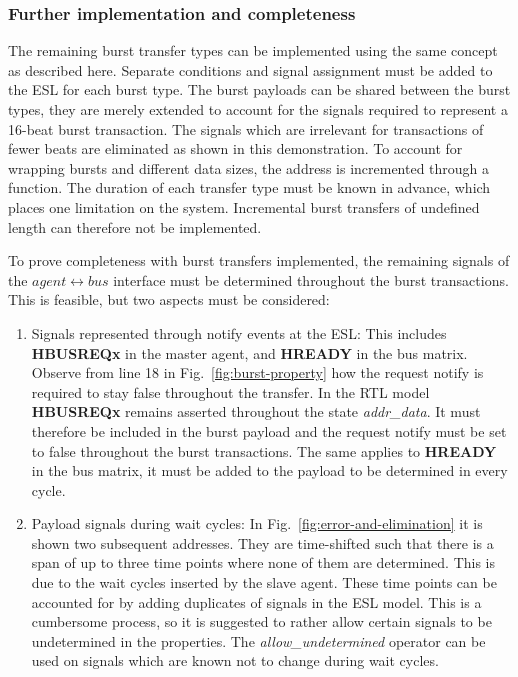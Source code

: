 \subsubsection{Further implementation and completeness}
The remaining burst transfer types can be implemented using the same concept as described here. Separate conditions and signal assignment must be added to the ESL for each burst type. The burst payloads can be shared between the burst types, they are merely extended to account for the signals required to represent a 16-beat burst transaction. The signals which are irrelevant for transactions of fewer beats are eliminated as shown in this demonstration. To account for wrapping bursts and different data sizes, the address is incremented through a function. The duration of each transfer type must be known in advance, which places one limitation on the system. Incremental burst transfers of undefined length can therefore not be implemented. \par
To prove completeness with burst transfers implemented, the remaining signals of the $agent\leftrightarrow bus$ interface must be determined throughout the burst transactions. This is feasible, but two aspects must be considered: 
\begin{enumerate}
 \item Signals represented through notify events at the ESL: This includes \textbf{HBUSREQx} in the master agent, and \textbf{HREADY} in the bus matrix. Observe from line 18 in Fig.~\ref{fig:burst-property} how the request notify is required to stay false throughout the transfer. In the RTL model \textbf{HBUSREQx} remains asserted throughout the state \textit{addr\_data}. It must therefore be included in the burst payload and the request notify must be set to false throughout the burst transactions. The same applies to \textbf{HREADY} in the bus matrix, it must be added to the payload to be determined in every cycle.
 \item Payload signals during wait cycles: In Fig.~\ref{fig:error-and-elimination} it is shown two subsequent addresses. They are time-shifted such that there is a span of up to three time points where none of them are determined. This is due to the wait cycles inserted by the slave agent. These time points can be accounted for by adding duplicates of signals in the ESL model. This is a cumbersome process, so it is suggested to rather allow certain signals to be undetermined in the properties. The \textit{allow\_undetermined} operator can be used on signals which are known not to change during wait cycles. 
\end{enumerate}

